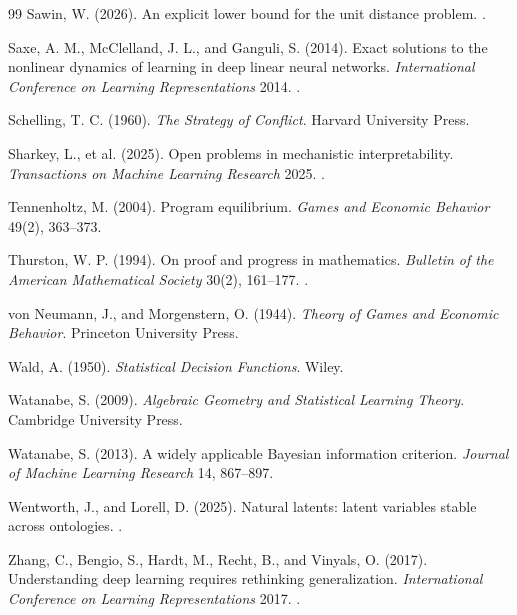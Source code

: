 \begin{thebibliography}{99}
 Sawin, W. (2026). An explicit lower bound for the unit distance problem. .

 Saxe, A. M., McClelland, J. L., and Ganguli, S. (2014). Exact solutions to the nonlinear dynamics of learning in deep linear neural networks. \emph{International Conference on Learning Representations} 2014. .

 Schelling, T. C. (1960). \emph{The Strategy of Conflict}. Harvard University Press.

 Sharkey, L., et al. (2025). Open problems in mechanistic interpretability. \emph{Transactions on Machine Learning Research} 2025. .






 Tennenholtz, M. (2004). Program equilibrium. \emph{Games and Economic Behavior} 49(2), 363--373.


 Thurston, W. P. (1994). On proof and progress in mathematics. \emph{Bulletin of the American Mathematical Society} 30(2), 161--177. .


 von Neumann, J., and Morgenstern, O. (1944). \emph{Theory of Games and Economic Behavior}. Princeton University Press.

 Wald, A. (1950). \emph{Statistical Decision Functions}. Wiley.

 Watanabe, S. (2009). \emph{Algebraic Geometry and Statistical Learning Theory}. Cambridge University Press.

 Watanabe, S. (2013). A widely applicable Bayesian information criterion. \emph{Journal of Machine Learning Research} 14, 867--897.

 Wentworth, J., and Lorell, D. (2025). Natural latents: latent variables stable across ontologies. .

 Zhang, C., Bengio, S., Hardt, M., Recht, B., and Vinyals, O. (2017). Understanding deep learning requires rethinking generalization. \emph{International Conference on Learning Representations} 2017. .


\end{thebibliography}
